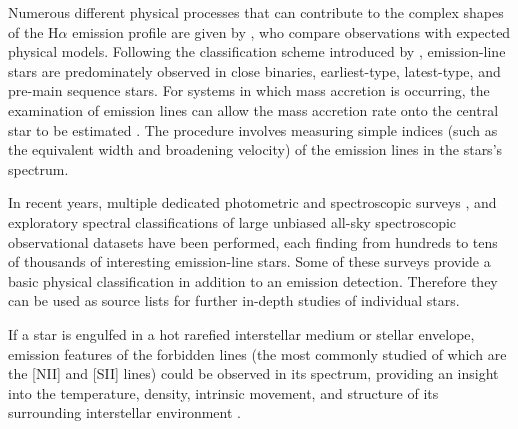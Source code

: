 Numerous different physical processes that can contribute to the complex shapes of the H$\alpha$ emission profile are given by \citet{1996A&AS..120..229R, 2011AJ....141..150J, 2014ApJ...795...82S, 2018AJ....156...97I}, who compare observations with expected physical models. Following the classification scheme introduced by \citet{2007ASSL..342.....K}, emission-line stars are predominately observed in close binaries, earliest-type, latest-type, and pre-main sequence stars. For systems in which mass accretion is occurring, the examination of emission lines can allow the mass accretion rate onto the central star to be estimated \citep{2003ApJ...582.1109W, 2004A&A...424..603N}. The procedure involves measuring simple indices (such as the equivalent width and broadening velocity) of the emission lines in the stars's spectrum.

In recent years, multiple dedicated photometric and spectroscopic surveys \citep[e.g.][]{2008MNRAS.384.1277W, 2008MNRAS.388.1879M, 2012ApJS..200...14M, 2012AJ....143...61N, 2014MNRAS.440.2036D, 2016MNRAS.456.1424A, 2016ASPC..505...66N}, and exploratory spectral classifications of large unbiased all-sky spectroscopic observational datasets \citep[e.g.][]{1999A&AS..134..255K, 2012MNRAS.425..355R, 2015A&A...581A..52T, 2016ASPC..505...66N, 2016RAA....16..138H, 2017ApJS..228...24T} have been performed, each finding from hundreds to tens of thousands of interesting emission-line stars. Some of these surveys provide a basic physical classification in addition to an emission detection. Therefore they can be used as source lists for further in-depth studies of individual stars.

If a star is engulfed in a hot rarefied interstellar medium or stellar envelope, emission features of the forbidden lines (the most commonly studied of which are the [NII] and [SII] lines) could be observed in its spectrum, providing an insight into the temperature, density, intrinsic movement, and structure of its surrounding interstellar environment \citep{1973ApJ...184...93B, 1993Ap&SS.204..205R, 2005MNRAS.361..813E, 2016A&A...591A..74D, 2017A&A...604A.135D}.

